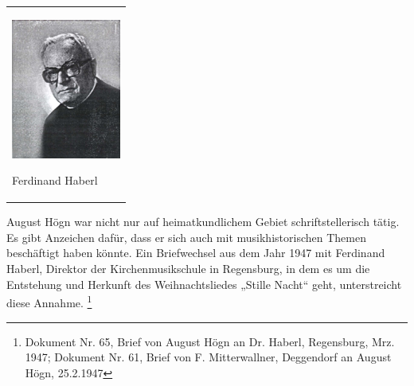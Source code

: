 \begin{flushleft}
\tablefirsthead{}
\tablehead{}
\tabletail{}
\tablelasttail{}
\begin{supertabular}{m{3.7879999cm}}

\begin{center}

\includegraphics[width=3.605cm,height=4.6cm]{pictures/zulassungsarbeit-img045.jpg}

\end{center}
Ferdinand Haberl\\
\end{supertabular}
\end{flushleft}
August Högn war nicht nur auf heimatkundlichem Gebiet schriftstellerisch
tätig. Es gibt Anzeichen dafür, dass er sich auch mit musikhistorischen
Themen beschäftigt haben könnte. Ein Briefwechsel aus dem Jahr 1947 mit
Ferdinand Haberl, Direktor der Kirchenmusikschule in Regensburg, in dem
es um die Entstehung und Herkunft des Weihnachtsliedes „Stille Nacht“
geht, unterstreicht diese Annahme. \footnote{Dokument Nr. 65, Brief von
August Högn an Dr. Haberl, Regensburg, Mrz. 1947; Dokument Nr. 61,
Brief von F. Mitterwallner, Deggendorf an August Högn, 25.2.1947}
